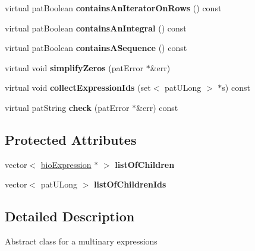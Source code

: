 \begin{DoxyCompactItemize}
virtual pat\+Boolean {\bfseries contains\+An\+Iterator\+On\+Rows} () const
\item 
\mbox{\label{classbio_arith_multinary_expression_a11268a13685f7d66c2362ce5c8b4468b}} 
virtual pat\+Boolean {\bfseries contains\+An\+Integral} () const
\item 
\mbox{\label{classbio_arith_multinary_expression_a51de24ca079fccb0ca51e40ba707e908}} 
virtual pat\+Boolean {\bfseries contains\+A\+Sequence} () const
\item 
\mbox{\label{classbio_arith_multinary_expression_af846c5bbae18e41de5d8ce9dcd7a549f}} 
virtual void {\bfseries simplify\+Zeros} (pat\+Error $\ast$\&err)
\item 
\mbox{\label{classbio_arith_multinary_expression_a33798f6bf71d8bdfc17b4220195218be}} 
virtual void {\bfseries collect\+Expression\+Ids} (set$<$ pat\+U\+Long $>$ $\ast$s) const
\item 
\mbox{\label{classbio_arith_multinary_expression_af09caa161b5988194efc389e7ed3f199}} 
virtual pat\+String {\bfseries check} (pat\+Error $\ast$\&err) const
\end{DoxyCompactItemize}
\subsection*{Protected Attributes}
\begin{DoxyCompactItemize}
\item 
\mbox{\label{classbio_arith_multinary_expression_af2eb40560537ea5d77d5c4a137195f6c}} 
vector$<$ \hyperlink{classbio_expression}{bio\+Expression} $\ast$ $>$ {\bfseries list\+Of\+Children}
\item 
\mbox{\label{classbio_arith_multinary_expression_ae0410053810d53bee59471478d9b3add}} 
vector$<$ pat\+U\+Long $>$ {\bfseries list\+Of\+Children\+Ids}
\end{DoxyCompactItemize}


\subsection{Detailed Description}
Abstract class for a multinary expressions 


